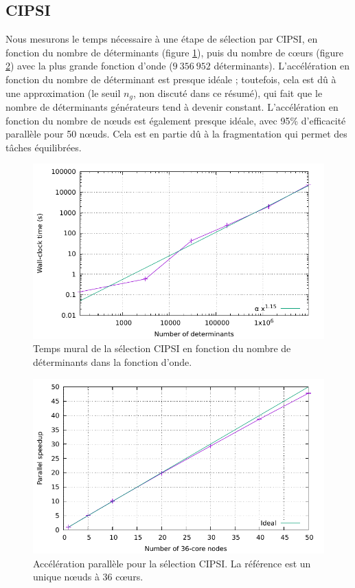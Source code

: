 \documentclass[./thesis.tex]{subfiles}
\begin{document}
\subsection{CIPSI}
Nous mesurons le temps nécessaire à une étape de sélection par CIPSI, en fonction du nombre de déterminants (figure \ref{fig:scaling_sel_ndet_fr}), puis du nombre de cœurs (figure \ref{fig:scaling_sel_node_fr}) avec la plus grande fonction d'onde ($9~356~952$ déterminants).
L'accélération en fonction du nombre de déterminant est presque idéale ; toutefois, cela est dû à une approximation (le seuil $n_g$, non discuté dans ce résumé), qui fait que le nombre de déterminants générateurs tend à devenir constant.
L'accélération en fonction du nombre de nœuds est également presque idéale, avec 95\% d'efficacité parallèle pour 50 nœuds. Cela est en partie dû à la fragmentation qui permet des tâches équilibrées.
\begin{figure}[h!]
    \begin{center}
      \includegraphics[width=0.8\columnwidth]{figures/perf/scaling_sel_det}
      \caption{Temps mural de la sélection CIPSI en fonction du nombre de déterminants dans la fonction d'onde.}
      \label{fig:scaling_sel_ndet_fr}
    \end{center}
\end{figure}
\begin{figure}[h!]
    \begin{center}
      \includegraphics[width=0.8\columnwidth]{figures/perf/scaling_sel_node}
      \caption{Accélération parallèle pour la sélection CIPSI. La référence est un unique nœuds à 36 cœurs.}
      \label{fig:scaling_sel_node_fr}
    \end{center}
\end{figure}
\end{document}
